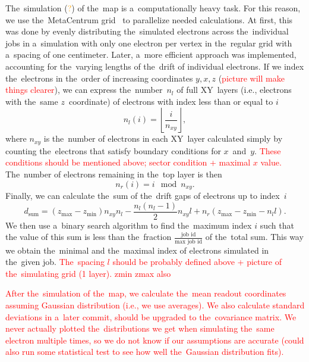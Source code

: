 		The~simulation (\textcolor{orange}{?}) of the~map is a~computationally heavy task. For this reason, we use the~MetaCentrum grid~\cite{metacentrum} to parallelize needed calculations. At first, this was done by evenly distributing the~simulated electrons across the~individual jobs in a~simulation with only one electron per vertex in the~regular grid with a~spacing of one centimeter. Later, a~more efficient approach was implemented, accounting for the~varying lengths of the~drift of individual electrons. If we index the~electrons in the~order of increasing coordinates $y,x,z$ (\textcolor{red}{picture will make things clearer}), we can express the~number~$n_l$ of full XY~layers (i.e., electrons with the~same $z$~coordinate) of electrons with index less than or equal to $i$
			\begin{equation}
				n_l(i) = \left\lfloor\frac{i}{n_{xy}}\right\rfloor,
			\end{equation}
		where $n_{xy}$ is the~number of electrons in each XY~layer calculated simply by counting the~electrons that satisfy boundary conditions for $x$~and~$y$. \textcolor{red}{These conditions should be mentioned above; sector condition + maximal $x$ value.} The~number of electrons remaining in the~top layer is then
			\begin{equation}
				n_r(i) = i\!\!\!\!\mod n_{xy}.
			\end{equation}
		Finally, we can calculate the~sum of the~drift gaps of electrons up to index~$i$
			\begin{equation}
				d_\text{sum} = (z_\text{max}-z_\text{min})n_{xy}n_l-\frac{n_l(n_l-1)}{2}n_{xy}l+n_r(z_\text{max}-z_\text{min}-n_l l).
			\end{equation}
		We then use a~binary search algorithm to find the~maximum index $i$ such that the value of this sum is less than the~fraction $\frac{\text{job id}}{\text{max job id}}$ of the~total sum. This way we obtain the~minimal and the~maximal index of electrons simulated in the~given job.
		\textcolor{red}{The~spacing $l$ should be probably defined above + picture of the~simulating grid (1 layer). zmin zmax also}
		
		\textcolor{red}{After the~simulation of the~map, we calculate the~mean readout coordinates assuming Gaussian distribution (i.e., we use averages). We also calculate standard deviations in a~later commit, should be upgraded to the~covariance matrix. We never actually plotted the~distributions we get when simulating the~same electron multiple times, so we do not know if our assumptions are accurate (could also run some statistical test to see how well the~Gaussian distribution fits).}
		
